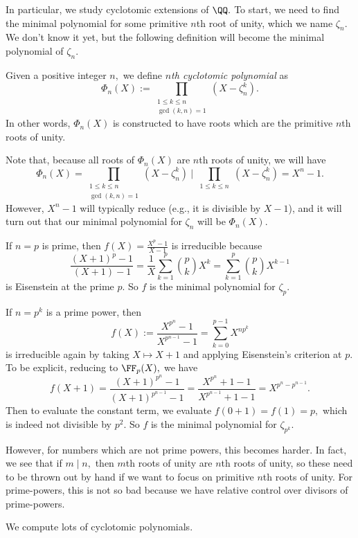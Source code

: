 \documentclass[../notes.tex]{subfiles}
\begin{document}
In particular, we study cyclotomic extensions of $\QQ.$ To start, we need to find the minimal polynomial for some primitive $n$th root of unity, which we name $\zeta_n.$ We don't know it yet, but the following definition will become the minimal polynomial of $\zeta_n.$
\begin{definition}
	Given a positive integer $n,$ we define \textit{$n$th cyclotomic polynomial} as
	\[\Phi_n(X):=\prod_{\substack{1\le k\le n\\\gcd(k,n)=1}}\left(X-\zeta_n^k\right).\]
	In other words, $\Phi_n(X)$ is constructed to have roots which are the primitive $n$th roots of unity.
\end{definition}
Note that, because all roots of $\Phi_n(X)$ are $n$th roots of unity, we will have
\[\Phi_n(X)=\prod_{\substack{1\le k\le n\\\gcd(k,n)=1}}\left(X-\zeta_n^k\right)~\bigg|~\prod_{\substack{1\le k\le n}}\left(X-\zeta_n^k\right)=X^n-1.\]
However, $X^n-1$ will typically reduce (e.g., it is divisible by $X-1$), and it will turn out that our minimal polynomial for $\zeta_n$ will be $\Phi_n(X).$
\begin{example}
	If $n=p$ is prime, then $f(X)=\frac{X^p-1}{X-1}$ is irreducible because
	\[\frac{(X+1)^p-1}{(X+1)-1}=\frac1X\sum_{k=1}^p\binom pkX^k=\sum_{k=1}^p\binom pkX^{k-1}\]
	is Eisenstein at the prime $p.$ So $f$ is the minimal polynomial for $\zeta_p.$
\end{example}
\begin{example} \label{ex:primepowercyclo}
	If $n=p^k$ is a prime power, then
	\[f(X):=\frac{X^{p^n}-1}{X^{p^{n-1}}-1}=\sum_{k=0}^{p-1}X^{np^k}\]
	is irreducible again by taking $X\mapsto X+1$ and applying Eisenstein's criterion at $p.$ To be explicit, reducing to $\FF_p(X),$ we have
	\[f(X+1)=\frac{(X+1)^{p^n}-1}{(X+1)^{p^{n-1}}-1}=\frac{X^{p^n}+1-1}{X^{p^{n-1}}+1-1}=X^{p^n-p^{n-1}}.\]
	Then to evaluate the constant term, we evaluate $f(0+1)=f(1)=p,$ which is indeed not divisible by $p^2.$ So $f$ is the minimal polynomial for $\zeta_{p^k}.$
\end{example}
However, for numbers which are not prime powers, this becomes harder. In fact, we see that if $m\mid n,$ then $m$th roots of unity are $n$th roots of unity, so these need to be thrown out by hand if we want to focus on primitive $n$th roots of unity. For prime-powers, this is not so bad because we have relative control over divisors of prime-powers.
\begin{exe}
	We compute lots of cyclotomic polynomials.
\end{exe}
\end{document}
